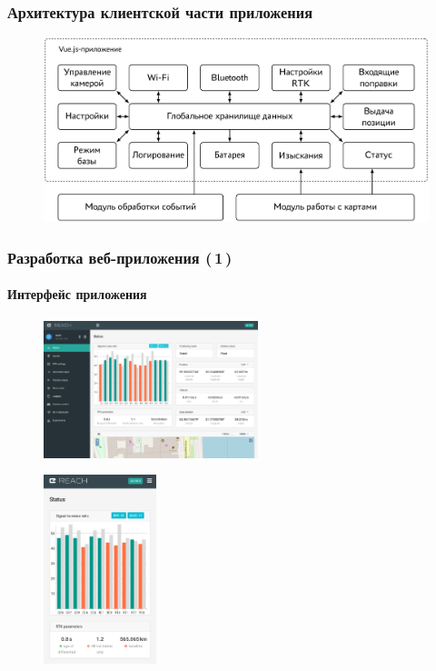 \documentclass[xetex,с,aspectratio=169]{beamer}
\begin{document}
%
%
\begin{frame}
  \frametitle{Архитектура клиентской части приложения}
  \vskip -0.25cm
  \begin{figure}[h]
    \centering
    \includegraphics[width=.9\textwidth]{../img/tikz/fe-architecture/pic}
  \end{figure}
\end{frame}


%
%
\begin{frame}
  \frametitle{Разработка веб-приложения (\,1\,)}
  \framesubtitle{Интерфейс приложения}

  \begin{minipage}{\textwidth}
    \centering
    \begin{minipage}[c]{.5\textwidth}
      \centering
      \begin{figure}[c]
        \centering
        \includegraphics[height=4cm]{../img/reachview/homepage_responsive-lg}
      \end{figure}
    \end{minipage}
    \hspace{2em}
    \begin{minipage}[c]{.3\textwidth}
      \centering
      \begin{figure}[c]
        \centering
        \includegraphics[height=5.5cm]{../img/reachview/homepage_responsive-xs}
      \end{figure}
    \end{minipage}
  \end{minipage}
\end{frame}
\end{document}
